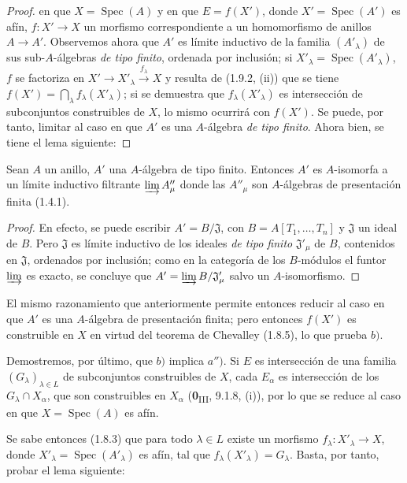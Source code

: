 \begin{proof}
en que $X=\operatorname{Spec}(A)$ y en que $E=f(X')$, donde
$X'=\operatorname{Spec}(A')$ es afín, $f:X'\to X$ un morfismo
correspondiente a un homomorfismo de anillos $A\to A'$. Observemos ahora que
$A'$ es límite inductivo de la familia $(A'_\lambda)$ de sus
sub-$A$-álgebras \emph{de tipo finito}, ordenada por inclusión; si
$X'_\lambda=\operatorname{Spec}(A'_\lambda)$, $f$ se factoriza en
$X'\to X'_\lambda\xrightarrow{f_\lambda}X$ y resulta de (1.9.2, (ii))
que se tiene $f(X')=\bigcap_\lambda f_\lambda(X'_\lambda)$; si se demuestra
que $f_\lambda(X'_\lambda)$ es intersección de subconjuntos construibles de
$X$, lo mismo ocurrirá con $f(X')$. Se puede, por tanto, limitar al caso en que $A'$ es
una $A$-álgebra \emph{de tipo finito}. Ahora bien, se tiene el lema siguiente:
\end{proof}

\begin{lemma}[1.9.3.1]
\label{IV.1.9.3.1-fr}
Sean $A$ un anillo, $A'$ una $A$-álgebra de tipo finito. Entonces $A'$ es
$A$-isomorfa a un límite inductivo filtrante $\varinjlim A''_\mu$ donde las
$A''_\mu$ son $A$-álgebras de presentación finita \textup{(1.4.1)}.
\end{lemma}

\begin{proof}
En efecto, se puede escribir $A'=B/\mathfrak J$, con
$B=A[T_1,\ldots,T_n]$ y $\mathfrak J$ un ideal de $B$. Pero $\mathfrak J$
es límite inductivo de los ideales \emph{de tipo finito} $\mathfrak J'_\mu$ de
$B$, contenidos en $\mathfrak J$, ordenados por inclusión; como en la
categoría de los $B$-módulos el funtor $\varinjlim$ es exacto, se concluye
que $A'=\varinjlim B/\mathfrak J'_\mu$ salvo un $A$-isomorfismo.
\end{proof}

El mismo razonamiento que anteriormente permite entonces reducir al caso en que $A'$
es una $A$-álgebra de presentación finita; pero entonces $f(X')$ es
construible en $X$ en virtud del teorema de Chevalley (1.8.5), lo que
prueba $b)$.

Demostremos, por último, que $b)$ implica $a'')$. Si $E$ es intersección de una
familia $(G_\lambda)_{\lambda\in L}$ de subconjuntos construibles de $X$,
cada $E_\alpha$ es intersección de los $G_\lambda\cap X_\alpha$, que son
construibles en $X_\alpha$ (\textbf{0}\textsubscript{III}, 9.1.8, (i)), por lo que se
reduce al caso en que $X=\operatorname{Spec}(A)$ es afín.

Se sabe entonces (1.8.3) que para todo $\lambda\in L$ existe un morfismo
$f_\lambda:X'_\lambda\to X$, donde
$X'_\lambda=\operatorname{Spec}(A'_\lambda)$ es afín, tal que
$f_\lambda(X'_\lambda)=G_\lambda$. Basta, por tanto, probar el lema
siguiente:

